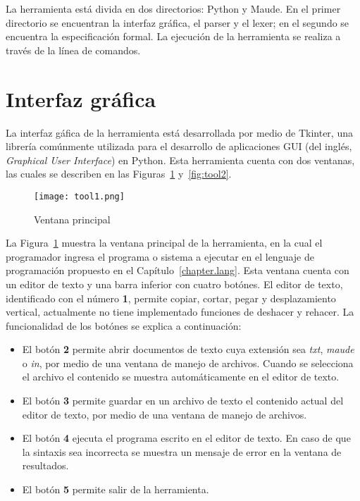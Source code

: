 La herramienta est\'a divida en dos directorios: Python y Maude. En el primer directorio se encuentran la interfaz gr\'afica, el parser y el lexer; en el segundo se encuentra la especificaci\'on formal. La ejecuci\'on de la herramienta se realiza a trav\'es de la l\'inea de comandos.

\section{Interfaz gr\'afica}
\label{gui.envir}

La interfaz g\'afica de la herramienta est\'a desarrollada por medio de Tkinter, una librer\'ia com\'unmente utilizada para el desarrollo de aplicaciones GUI (del ingl\'es, \textit{Graphical User Interface}) en Python. Esta herramienta cuenta con dos ventanas, las cuales se describen en las Figuras~\ref{fig:tool1} y~\ref{fig:tool2}.

\begin{figure}[htbp] %
   \centering
   \texttt{[image: tool1.png]}
   \caption{Ventana principal}
   \label{fig:tool1}
\end{figure}

La Figura~\ref{fig:tool1} muestra la ventana principal de la herramienta, en la cual el programador ingresa el programa o sistema a ejecutar en el lenguaje de programaci\'on propuesto en el Cap\'itulo~\ref{chapter.lang}. Esta ventana cuenta con un editor de texto y una barra inferior con cuatro bot\'ones. El editor de texto, identificado con el n\'umero \textbf{1}, permite copiar, cortar, pegar y desplazamiento vertical, actualmente no tiene implementado funciones de deshacer y rehacer. La funcionalidad de los bot\'ones se explica a continuaci\'on:

\begin{itemize}
\item El bot\'on \textbf{2} permite abrir documentos de texto cuya extensi\'on sea \textit{txt}, \textit{maude} o \textit{in}, por medio de una ventana de manejo de archivos. Cuando se selecciona el archivo el contenido se muestra autom\'aticamente en el editor de texto.
\item El bot\'on \textbf{3} permite guardar en un archivo de texto el contenido actual del editor de texto, por medio de una ventana de manejo de archivos.
\item El bot\'on \textbf{4} ejecuta el programa escrito en el editor de texto. En caso de que la sintaxis sea incorrecta se muestra un mensaje de error en la ventana de resultados.
\item El bot\'on \textbf{5} permite salir de la herramienta. 
\end{itemize}

